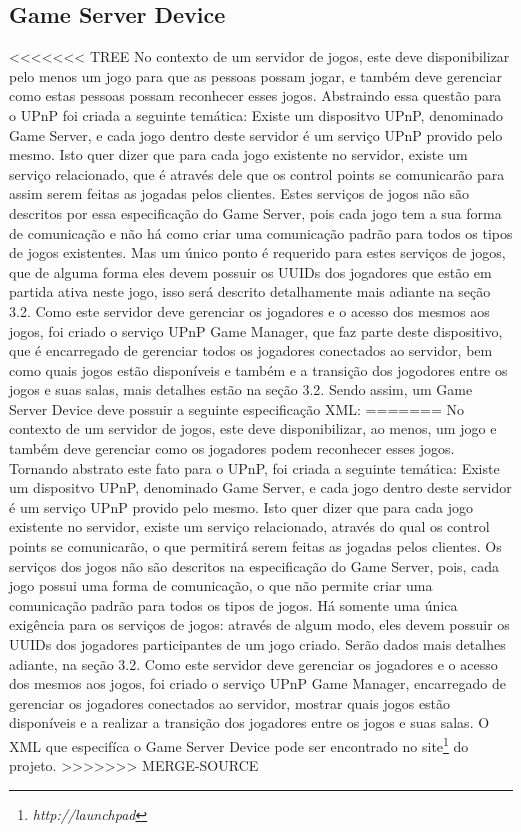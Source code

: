 \documentclass[a4paper]{sbgames}               %
\begin{document}
\subsection{Game Server Device}
<<<<<<< TREE
No contexto de um servidor de jogos, este deve disponibilizar pelo menos um jogo para que as pessoas possam jogar, e também deve gerenciar como estas pessoas possam reconhecer esses jogos. 
Abstraindo essa questão para o UPnP foi criada a seguinte temática: Existe um dispositvo UPnP, denominado Game Server, e cada jogo dentro deste servidor é um serviço UPnP provido pelo mesmo. Isto quer dizer que para cada jogo existente no servidor, existe um serviço relacionado, que é através dele que os control points se comunicarão para assim serem feitas as jogadas pelos clientes. Estes serviços de jogos não são descritos por essa especificação do Game Server, pois cada jogo tem a sua forma de comunicação e não há como criar uma comunicação padrão para todos os tipos de jogos existentes. Mas um único ponto é requerido para estes serviços de jogos, que de alguma forma eles devem possuir os UUIDs dos jogadores que estão em partida ativa neste jogo, isso será descrito detalhamente mais adiante na seção 3.2. Como este servidor deve gerenciar os jogadores e o acesso dos mesmos aos jogos, foi criado o serviço UPnP Game Manager, que faz parte deste dispositivo, que é encarregado de gerenciar todos os jogadores conectados ao servidor, bem como quais jogos estão disponíveis e também e a transição dos jogodores entre os jogos e suas salas, mais detalhes estão na seção 3.2.
Sendo assim, um Game Server Device deve possuir a seguinte especificação XML:
=======
No contexto de um servidor de jogos, este deve disponibilizar, ao menos, um jogo e também deve gerenciar como os jogadores podem reconhecer esses jogos.
Tornando abstrato este fato para o UPnP, foi criada a seguinte temática: Existe um dispositvo UPnP, denominado Game Server, e cada jogo dentro deste servidor é um serviço UPnP provido pelo mesmo. Isto quer dizer que para cada jogo existente no servidor, existe um serviço relacionado, através do qual os control points se comunicarão, o que permitirá serem feitas as jogadas pelos clientes. Os serviços dos jogos não são descritos na especificação do Game Server, pois, cada jogo possui uma forma de comunicação, o que não permite criar uma comunicação padrão para todos os tipos de jogos. Há somente uma única exigência para os serviços de jogos: através de algum modo, eles devem possuir os UUIDs dos jogadores participantes de um jogo criado. Serão dados mais detalhes adiante, na seção 3.2. Como este servidor deve gerenciar os jogadores e o acesso dos mesmos aos jogos, foi criado o serviço UPnP Game Manager, encarregado de gerenciar os jogadores conectados ao servidor, mostrar quais jogos estão disponíveis e a realizar a transição dos jogadores entre os jogos e suas salas.
O XML que especifíca o Game Server Device pode ser encontrado no site\footnote{\textit{http://launchpad}} do projeto.
>>>>>>> MERGE-SOURCE
\end{document}
